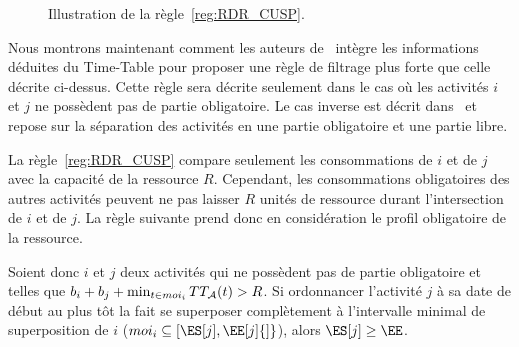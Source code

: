 \begin{ex}
\begin{figure}[!htb]
    \caption{Illustration de la règle~\ref{reg:RDR_CUSP}.}
    \label{fig:RDR_CUSP}
  \end{figure}
\end{ex}

Nous montrons maintenant comment les auteurs de~\cite{Gay2015} intègre
les informations déduites du Time-Table pour proposer une règle de
filtrage plus forte que celle décrite ci-dessus. Cette règle sera
décrite seulement dans le cas où les activités $i$ et $j$ ne possèdent
pas de partie obligatoire. Le cas inverse est décrit
dans~\cite{Gay2015} et repose sur la séparation des activités en une
partie obligatoire et une partie libre.


La règle~\ref{reg:RDR_CUSP} compare seulement les consommations de $i$
et de $j$ avec la capacité de la ressource $R$. Cependant, les
consommations obligatoires des autres activités peuvent ne pas laisser
$R$ unités de ressource durant l'intersection de $i$ et de $j$. La
règle suivante prend donc en considération le profil obligatoire de la
ressource.

\begin{reg}
\label{reg:TTDR_CUSP}
Soient donc $i$ et $j$ deux activités qui ne possèdent pas de partie
obligatoire et telles que $ b_i +b_j + \min_{t \in moi_i} TT_{{\cal A}}(t) >
R$.   Si ordonnancer l'activité
 $j$ à sa date de début au plus tôt la fait se superposer complètement
 à l’intervalle minimal de superposition de $i$ ($moi_i \subseteq
 [\ES[j],\EE[j]{]}$), alors $\ES[j] \ge \EE$.
\end{reg}

